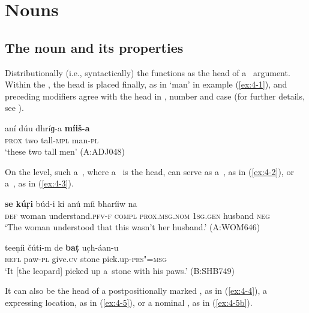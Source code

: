 \chapter{Nouns}
\label{chap:4}

\section{The {noun} and its properties}
\label{sec:4-1}


Distributionally (i.e., syntactically) the  functions as the head of a~  argument. Within the  , the head is placed finally, as in `man' in example (\ref{ex:4-1}), and preceding modifiers agree with the head in , number and case (for further details, see ).


\begin{exe}
\ex
\label{ex:4-1}
\gll aní dúu dhríɡ-a \textbf{míiš-a} \\
	\textsc{prox} two tall-\textsc{mpl} man-\textsc{pl} \\
\glt `these two tall men' (A:ADJ048)
\end{exe}

On the  level, such a~, where a~ is the head, can serve as a~, as in (\ref{ex:4-2}), or a~, as in (\ref{ex:4-3}).

\begin{exe}
\ex
\label{ex:4-2}
\gll \textbf{se} \textbf{kúṛi} búd-i ki anú míi bharíiw na\\
	\textsc{def} woman understand.\textsc{pfv-f} \textsc{compl} \textsc{prox.msg.nom} \textsc{1sg.gen} husband \textsc{neg}\\
\glt `The woman understood that this wasn't her husband.' (A:WOM646)

\ex
\label{ex:4-3}
\gll teeṇíi čúti-m de \textbf{baṭ} uc̣h-áan-u \\
	\textsc{refl} paw-\textsc{pl} give.\textsc{cv} stone pick.up-\textsc{prs"=msg} \\
\glt `It [the leopard] picked up a~stone with his paws.' (B:SHB749)
\end{exe}

It can also be the head of a postpositionally marked  , as in (\ref{ex:4-4}), a   expressing location, as in (\ref{ex:4-5}), or a nominal , as in (\ref{ex:4-5b}).

